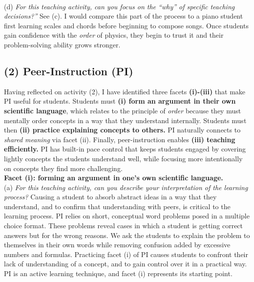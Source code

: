 \documentclass[../../../main.tex]{subfiles}
\begin{document}
\\
\vspace{0.25cm}
(d) \textit{For this teaching activity, can you focus on the ``why'' of specific teaching decisions?''}  See (c).  I would compare this part of the process to a piano student first learning scales and chords before beginning to compose songs.  Once students gain confidence with the \textit{order} of physics, they begin to trust it and their problem-solving ability grows stronger.

\subsection{(2) Peer-Instruction (PI)}

Having reflected on activity (2), I have identified three facets \textbf{(i)-(iii)} that make PI useful for students.  Students must \textbf{(i) form an argument in their own scientific language}, which relates to the principle of \textit{order} because they must mentally order concepts in a way that they understand internally.  Students must then \textbf{(ii) practice explaining concepts to others.}  PI naturally connects to \textit{shared meaning} via facet (ii).  Finally, peer-instruction enables \textbf{(iii) teaching efficiently.}  PI has built-in pace control that keeps students engaged by covering lightly concepts the students understand well, while focusing more intentionally on concepts they find more challenging.
\\
\vspace{0.25cm}
\textbf{Facet (i): forming an argument in one's own scientific language.}
\\
\vspace{0.25cm}
(a) \textit{For this teaching activity, can you describe your interpretation of the learning process?}  Causing a student to absorb abstract ideas in a way that they understand, and to confirm that understanding with peers, is critical to the learning process.  PI relies on short, conceptual word problems posed in a multiple choice format.  These problems reveal cases in which a student is getting correct answers but for the wrong reasons.  We ask the students to explain the problem to themselves in their own words while removing confusion added by excessive numbers and formulas.  Practicing facet (i) of PI causes students to confront their lack of understanding of a concept, and to gain control over it in a practical way.  PI is an active learning technique, and facet (i) represents its starting point.
\\
\end{document}
